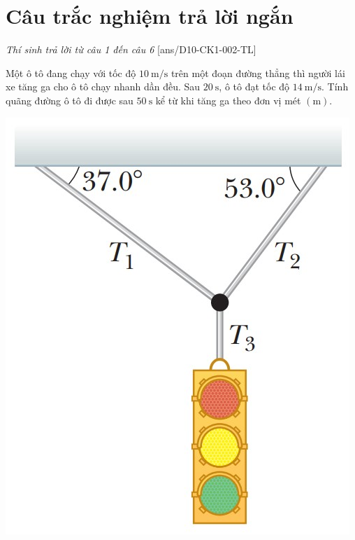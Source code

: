 \section{Câu trắc nghiệm trả lời ngắn} \textit{Thí sinh trả lời từ câu 1 đến câu 6}
\setcounter{ex}{0}
[ans/D10-CK1-002-TL]
\begin{ex}
Một ô tô đang chạy với tốc độ $\SI{10}{\meter/\second}$ trên một đoạn đường thẳng thì người lái xe tăng ga cho ô tô chạy nhanh dần đều. Sau $\SI{20}{\second}$, ô tô đạt tốc độ $\SI{14}{\meter/\second}$. Tính quãng đường ô tô đi được sau $\SI{50}{\second}$ kể từ khi tăng ga theo đơn vị mét $\left(\si{\meter}\right)$.	
	\loigiai{
		
	}
\end{ex}
\begin{ex}
{\vspace{-0.5cm}
	\includegraphics[scale=0.3]{figs/D10-CK1-002-4}}
	\loigiai{
		
	}
\end{ex}
